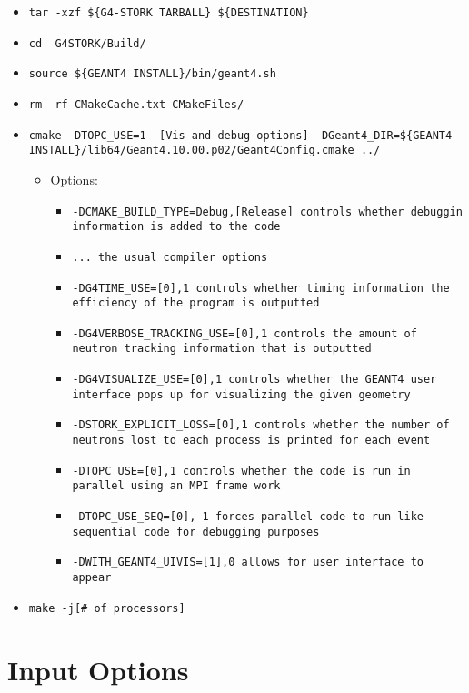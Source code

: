 \documentclass{article}
\begin{document}
\begin{itemize}
\begin{itemize}
\item \texttt{tar -xzf \$\{G4-STORK TARBALL\} \$\{DESTINATION\}}
\item \texttt{cd \ G4STORK/Build/}
\item \texttt{source \$\{GEANT4 INSTALL\}/bin/geant4.sh}
\item \texttt{rm -rf CMakeCache.txt CMakeFiles/ }
\item \texttt{cmake -DTOPC\_USE=1 -[Vis and debug options] -DGeant4\_DIR=\$\{GEANT4 INSTALL\}/lib64/Geant4.10.00.p02/Geant4Config.cmake ../}

\begin{itemize}
\item Options:

\begin{itemize}
\item \texttt{{}-DCMAKE\_BUILD\_TYPE=Debug,[Release] controls whether debuggin information is added to the code}
\item \texttt{{}... the usual compiler options}
\item \texttt{{}-DG4TIME\_USE=[0],1 controls whether timing information the efficiency of the program is outputted}
\item \texttt{{}-DG4VERBOSE\_TRACKING\_USE=[0],1 controls the amount of neutron tracking information that is outputted }
\item \texttt{{}-DG4VISUALIZE\_USE=[0],1 controls whether the GEANT4 user interface pops up for visualizing the given geometry}
\item \texttt{{}-DSTORK\_EXPLICIT\_LOSS=[0],1 controls whether the number of neutrons lost to each process is printed for each event }
\item \texttt{{}-DTOPC\_USE=[0],1 controls whether the code is run in parallel using an MPI frame work}
\item \texttt{{}-DTOPC\_USE\_SEQ=[0], 1 forces parallel code to run like sequential code for debugging purposes }
\item \texttt{{}-DWITH\_GEANT4\_UIVIS=[1],0 allows for user interface to appear }
\end{itemize}
\end{itemize}
\item \texttt{make -j[\# of processors]}
\end{itemize}
\end{itemize}

\section{Input Options}
\end{document}
